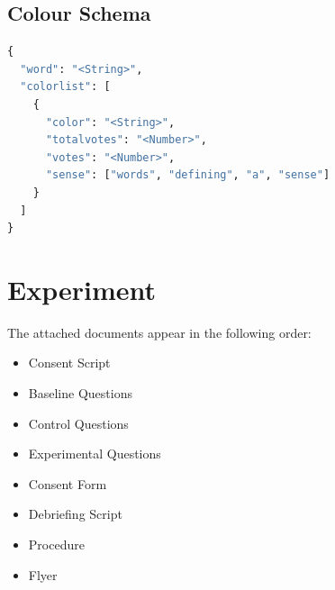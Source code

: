 \documentclass[11pt, twoside, reqno]{book}
\begin{document}
\begin{appendices}
\section{Colour Schema}
\begin{lstlisting}[language=Python]
{
  "word": "<String>",
  "colorlist": [
    { 
      "color": "<String>",
      "totalvotes": "<Number>",
      "votes": "<Number>",
      "sense": ["words", "defining", "a", "sense"]
    }
  ]
}
\end{lstlisting}

\chapter{Experiment}
The attached documents appear in the following order:
\begin{itemize}
  \item Consent Script
  \item Baseline Questions
  \item Control Questions
  \item Experimental Questions
  \item Consent Form
  \item Debriefing Script
  \item Procedure
  \item Flyer
\end{itemize}













\end{appendices}
\end{document}
